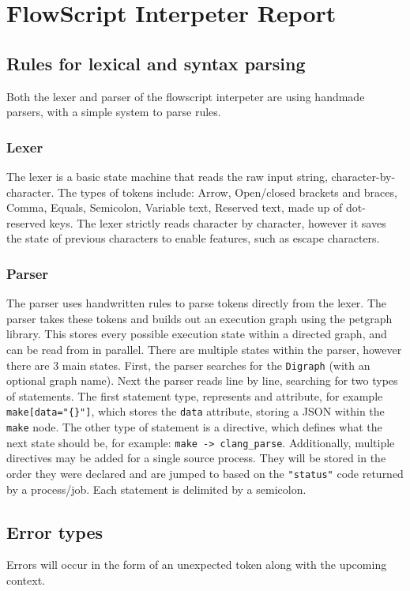 \documentclass{article}
\begin{document}
\section*{FlowScript Interpeter Report}
	\subsection{Rules for lexical and syntax parsing}
		Both the lexer and parser of the flowscript interpeter are using handmade parsers, with a simple system to parse rules.
		\subsubsection{Lexer}
			The lexer is a basic state machine that reads the raw input string, character-by-character. The types of tokens include: Arrow, Open/closed  brackets and braces, Comma, Equals, Semicolon, Variable text, Reserved text, made up of dot-reserved keys. The lexer strictly reads character by character, however it saves the state of previous characters to enable features, such as escape characters.
		\subsubsection{Parser}
			The parser uses handwritten rules to parse tokens directly from the lexer. The parser takes these tokens and builds out an execution graph using the petgraph library. This stores every possible execution state within a directed graph, and can be read from in parallel. There are multiple states within the parser, however there are 3 main states. First, the parser searches for the \texttt{Digraph} (with an optional graph name). Next the parser reads line by line, searching for two types of statements. The first statement type, represents and attribute, for example \texttt{make[data="\{\}"]}, which stores the \texttt{data} attribute, storing a JSON within the \texttt{make} node. The other type of statement is a directive, which defines what the next state should be, for example: \texttt{make -> clang\_parse}. Additionally, multiple directives may be added for a single source process. They will be stored in the order they were declared and are jumped to based on the \texttt{"status"} code returned by a process/job. Each statement is delimited by a semicolon.
	\subsection{Error types}
		Errors will occur in the form of an unexpected token along with the upcoming context.
		
\end{document}
